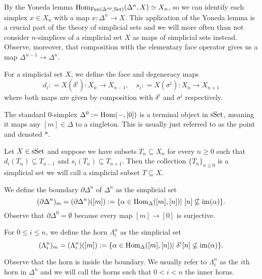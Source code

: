 \documentclass[../../thesis.tex]{subfiles}
\begin{document}
By the Yoneda lemma $\mathrm{Hom}_{\mathrm{Fun}(\Delta^{op}, \mathrm{Set})}(\Delta^n, X) \simeq X_n$, so we can identify each simplex $x\in X_n$ with a map $x:\Delta^n\to X$.
This application of the Yoneda lemma is a crucial part of the theory of simplicial sets and we will more often than not consider $n$-simplices of a simplicial set $X$ as maps of simplicial sets instead.
Observe, moreover, that composition with the elementary face operator gives us a map $\Delta^{n-1}\to\Delta^n$.
\begin{definition}
    For a simplicial set $X$, we define the face and degeneracy maps
    \[
        d_i: = X(\delta^i): X_{n} \to X_{n-1}, \quad s_i: = X(\sigma^i): X_{n} \to X_{n+1}
    \]
    where both maps are given by composition with $\delta^i$ and $\sigma^i$ respectively.
\end{definition}
\begin{example}
    The standard $0$-simplex $\Delta^0:=\mathrm{Hom}({-}, [0])$ is a terminal object in $\mathrm{sSet}$, meaning it maps any $[m]\in \Delta$ to a singleton.
    This is usually just referred to as the point and denoted $*$.
\end{example}
\begin{example}
    Let $X \in \mathrm{sSet}$ and suppose we have subsets $T_n\subseteq X_n$ for every $n\geq 0$ such that $d_i(T_n)\subseteq T_{n-1}$ and $s_i(T_n) \subseteq T_{n+1}$.
    Then the collection $\{T_n\}_{n\geq 0}$ is a simplicial set we will call a simplicial subset $T\subseteq X$.
\end{example}
\begin{definition}
    We define the boundary $\partial\Delta^n$ of $\Delta^n$ as the simplicial set
    \[
        (\partial\Delta^n)_m = (\partial\Delta^n)([m]) :=\{\alpha \in \Hom_{\Delta}([m], [n]) | [n] \not\subseteq \mathrm{im}(\alpha)\}.
    \]
    Observe that $\partial\Delta^0=\emptyset$ because every map $[m] \to [0]$ is surjective.
\end{definition}
\begin{definition}
    For $0\leq i \leq n$, we define the horn $\Lambda_i^n$ as the simplicial set
    \[
        (\Lambda_i^n)_m =(\Lambda_i^n)([m]) :=\{\alpha \in \Hom_{\Delta}([m], [n]) | \delta^i[n] \not\subseteq \mathrm{im}(\alpha)\}.
    \]
\end{definition}
Observe that the horn is inside the boundary.
We usually refer to $\Lambda_i^n$ as the $i$th horn in $\Delta^n$ and we will call the horns such that $0<i<n$ the inner horns.
\end{document}
